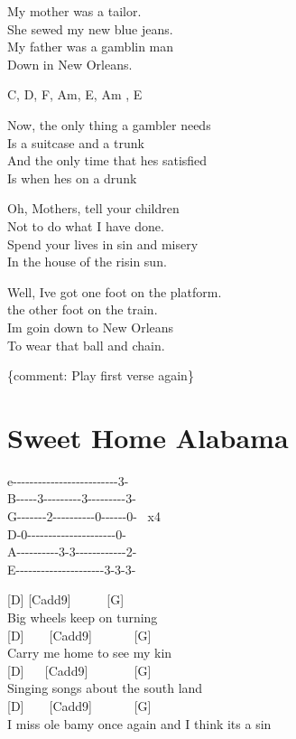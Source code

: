 \documentclass[
  letterpaper,
]{scrbook}
\begin{document}
My mother was a tailor.\\
She sewed my new blue jeans.\\
My father was a gamblin\textquotesingle{} man\\
Down in New Orleans.

C, D, F, Am, E, Am , E

Now, the only thing a gambler needs\\
Is a suitcase and a trunk\\
And the only time that he\textquotesingle s satisfied\\
Is when he\textquotesingle s on a drunk

Oh, Mothers, tell your children\\
Not to do what I have done.\\
Spend your lives in sin and misery\\
In the house of the risin\textquotesingle{} sun.

Well, I\textquotesingle ve got one foot on the platform.\\
the other foot on the train.\\
I\textquotesingle m goin\textquotesingle{} down to New Orleans\\
To wear that ball and chain.

\{comment: Play first verse again\}

\hypertarget{sweet-home-alabama}{%
\chapter{Sweet Home Alabama}\label{sweet-home-alabama}}

e\textbar-\/-\/-\/-\/-\/-\/-\/-\/-\/-\/-\/-\/-\/-\/-\/-\/-\/-\/-\/-\/-\/-\/-\/-\/-3-\textbar{}\\
B\textbar-\/-\/-\/-\/-3-\/-\/-\/-\/-\/-\/-\/-\/-3-\/-\/-\/-\/-\/-\/-\/-\/-3-\textbar{}\\
G\textbar-\/-\/-\/-\/-\/-\/-2-\/-\/-\/-\/-\/-\/-\/-\/-\/-0-\/-\/-\/-\/-\/-0-\textbar{}
~x4\\
D-0-\/-\/-\/-\/-\/-\/-\/-\/-\/-\/-\/-\/-\/-\/-\/-\/-\/-\/-\/-\/-0-\textbar{}
~ ~\\
A\textbar-\/-\/-\/-\/-\/-\/-\/-\/-\/-3-3-\/-\/-\/-\/-\/-\/-\/-\/-\/-\/-\/-2-\textbar{}\\
E\textbar-\/-\/-\/-\/-\/-\/-\/-\/-\/-\/-\/-\/-\/-\/-\/-\/-\/-\/-\/-\/-3-3-3-\textbar{}

{[}D{]} {[}Cadd9{]} ~ ~ ~ {[}G{]}\\
Big wheels keep on turning\\
{[}D{]} ~ ~ {[}Cadd9{]} ~ ~ ~ ~{[}G{]}\\
Carry me home to see my kin\\
{[}D{]} ~ ~{[}Cadd9{]} ~ ~ ~ ~ {[}G{]}\\
Singing songs about the south land\\
{[}D{]} ~ ~ {[}Cadd9{]} ~ ~ ~ ~{[}G{]} ~ ~ ~ ~ ~ ~ ~ ~ ~ ~ ~ ~ ~\\
I miss \textquotesingle ole\textquotesingle{} \textquotesingle bamy once
again and I think it\textquotesingle s a sin
\end{document}
